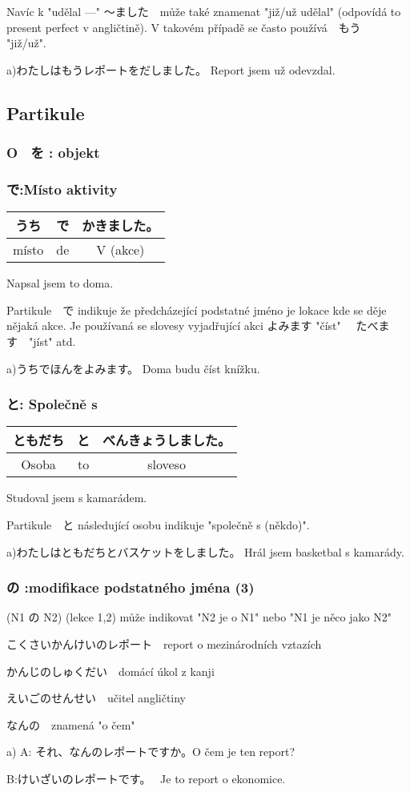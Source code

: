 Navíc k "udělal ---" 	〜ました　může také znamenat "již/už udělal" (odpovídá to present perfect v angličtině). V takovém případě se často používá　もう　 "již/už".

a)わたしはもうレポートをだしました。 Report jsem už odevzdal.

\subsection{Partikule}
\subsubsection{O　を : objekt}
\subsubsection{ で:Místo aktivity}
\begin{center}
\begin{tabular}{||c|c||c||}
\hline
うち&で&かきました。\\
\hline
místo&de&V (akce)\\
\hline
\end{tabular}
\end{center}
Napsal jsem to doma.

Partikule　で  indikuje že předcházející podstatné jméno je lokace kde se děje nějaká akce. Je používaná se slovesy vyjadřující akci よみます "číst" 　たべます　"jíst" atd.

a)うちでほんをよみます。 Doma budu číst knížku.


\subsubsection{ と: Společně s }
\begin{center}
\begin{tabular}{||c|c||c||}
\hline
ともだち&と&べんきょうしました。\\
\hline
Osoba&to&sloveso\\
\hline
\end{tabular}
\end{center}
Studoval jsem s kamarádem.

Partikule　と následující osobu indikuje "společně s (někdo)".

a)わたしはともだちとバスケットをしました。 Hrál jsem basketbal s kamarády.


\subsubsection{の :modifikace podstatného jména (3)}

(N1 の N2) (lekce 1,2) může indikovat "N2 je o N1" nebo "N1 je něco jako N2" 

こくさいかんけいのレポート　report o mezinárodních vztazích 

かんじのしゅくだい　domácí úkol z kanji

えいごのせんせい　učitel angličtiny

なんの　znamená "o čem" 

a) A: それ、なんのレポートですか。O čem je ten report?

B:けいざいのレポートです。　 Je to report o ekonomice.






